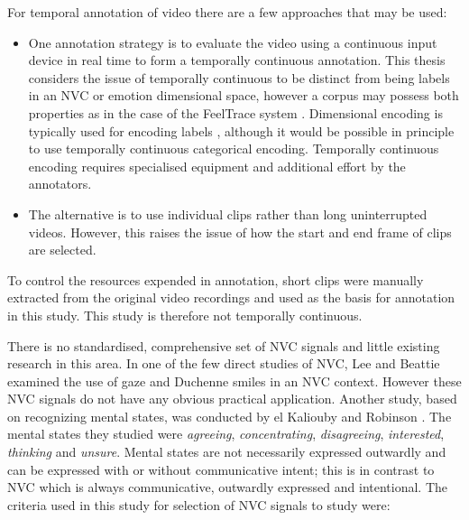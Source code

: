For temporal annotation of video there are a few approaches that may be used:
\begin{itemize}
 \item One annotation strategy is to evaluate the video using a continuous input device in real time to form a temporally continuous annotation. This thesis considers the issue of temporally continuous to be distinct from being \continuous labels in an \ac{NVC} or emotion dimensional space, however a corpus may possess both properties as in the case of the FeelTrace system \cite{Cowie2000}. Dimensional encoding is typically used for encoding \continuous labels \cite{Nicolaou2011}, although it would be possible in principle to use temporally continuous categorical encoding. Temporally continuous encoding requires  specialised equipment and additional effort by the annotators.
 \item The alternative is to use individual clips rather than long uninterrupted videos. However, this raises the issue of how the start and end frame of clips are selected.
\end{itemize}
To control the resources expended in annotation, short clips were manually extracted from the original video recordings and used as the basis for \continuous annotation in this study. This study is therefore not temporally continuous.

There is no standardised, comprehensive set of \ac{NVC} signals and little existing research in this area. In one of the few direct studies of \ac{NVC}, Lee and Beattie \cite{Lee1998} examined the use of gaze and Duchenne smiles in an \ac{NVC} context. However these \ac{NVC} signals do not have any obvious practical application. Another study, based on recognizing mental states, was conducted by el Kaliouby and Robinson \cite{ElKaliouby2004}. The mental states they studied were \textit{agreeing}, \textit{concentrating}, \textit{disagreeing}, \textit{interested}, \textit{thinking} and \textit{unsure}. Mental states are not necessarily expressed outwardly and can be expressed with or without communicative intent; this is in contrast to \ac{NVC} which is always communicative, outwardly expressed and intentional. The criteria used in this study for selection of \ac{NVC} signals to study were:

